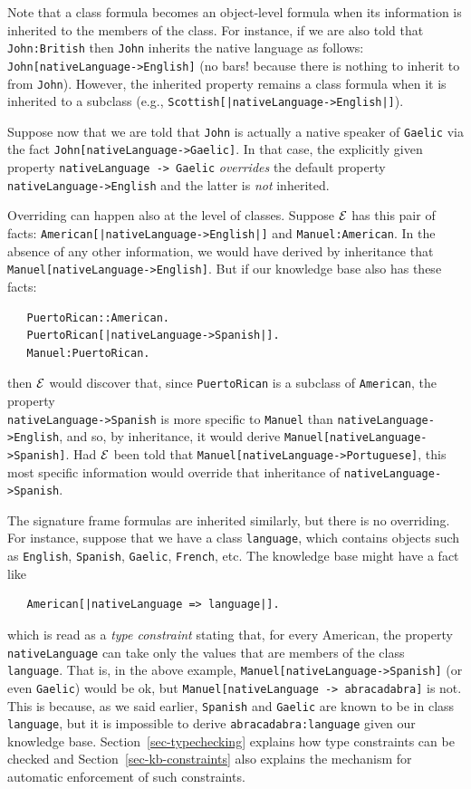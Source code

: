 \documentclass[11pt]{article}
\newcommand{\ERGO}{\mbox{\ensuremath{\cal{E}}\smaller{{\sc{RGO}}}}\xspace}
\newcommand{\FLSYSTEM}{\ERGO}
\begin{document}
  Note that a class formula becomes an object-level formula when its
  information is inherited to the members of the class. For instance, if we
  are also told that \texttt{John:British} then \texttt{John} inherits the
  native language as follows:  
  \texttt{John[nativeLanguage->English]} (no bars! because there is
  nothing to inherit to from \texttt{John}).
  However, the inherited property remains a class formula
  when it is inherited to a subclass (e.g.,
  \texttt{Scottish[|nativeLanguage->English|]}).

Suppose now that we are told that \texttt{John} is actually a native
speaker of \texttt{Gaelic} via the fact   \texttt{John[nativeLanguage->Gaelic]}.
In that case, the explicitly given property \texttt{nativeLanguage -> Gaelic}
\emph{overrides} the default property \texttt{nativeLanguage->English}  and
the latter is \emph{not} inherited.

Overriding can happen also at the level of classes. Suppose \FLSYSTEM has
this pair of facts: \texttt{American[|nativeLanguage->English|]} and
\texttt{Manuel:American}. In the absence of any other information, we
would have derived by inheritance that
\texttt{Manuel[nativeLanguage->English]}.
But if our knowledge base also has these facts:
\begin{verbatim}
   PuertoRican::American.
   PuertoRican[|nativeLanguage->Spanish|].
   Manuel:PuertoRican.
\end{verbatim}
then \FLSYSTEM would discover that, since \texttt{PuertoRican} is a
subclass of \texttt{American}, the property
\\
\texttt{nativeLanguage->Spanish}  is more specific to \texttt{Manuel} than
\texttt{nativeLanguage->English}, and so, by inheritance,  it would derive 
\texttt{Manuel[nativeLanguage->Spanish]}.
Had \FLSYSTEM been told that \texttt{Manuel[nativeLanguage->Portuguese]},
this
most specific information would override that inheritance of
\texttt{nativeLanguage->Spanish}.

The signature frame formulas are inherited similarly, but there is no
overriding. For instance, suppose that we have a class \texttt{language},
which contains objects such as \texttt{English}, \texttt{Spanish},
\texttt{Gaelic}, 
\texttt{French}, etc. The knowledge base might have a fact like
\begin{verbatim}
   American[|nativeLanguage => language|].
\end{verbatim}
which is read as a \emph{type constraint} stating that, for every American,
the property \texttt{nativeLanguage} can take only the values that are
members of the class \texttt{language}. That is, in the above example,
\texttt{Manuel[nativeLanguage->Spanish]} (or even \texttt{Gaelic})
would be ok, but \texttt{Manuel[nativeLanguage -> abracadabra]} is not. This
is because, as we said earlier, \texttt{Spanish} and \texttt{Gaelic} are 
known to be in class \texttt{language}, but it is impossible to derive
\texttt{abracadabra:language} given our knowledge
base.
Section~\ref{sec-typechecking} explains how type constraints can be
checked and Section~\ref{sec-kb-constraints} also explains the mechanism for
automatic enforcement of such constraints.
\end{document}
